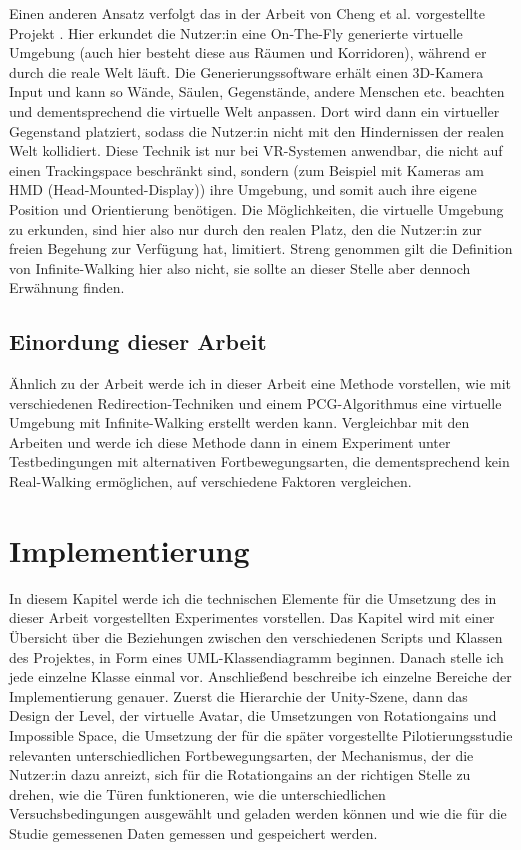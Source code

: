 Einen anderen Ansatz verfolgt das in der Arbeit \cite{microsoft} von Cheng et al. vorgestellte Projekt .
Hier erkundet die Nutzer:in eine On-The-Fly generierte virtuelle Umgebung (auch hier besteht diese aus Räumen und Korridoren), während er durch die reale Welt läuft. Die Generierungssoftware erhält einen 3D-Kamera Input und kann so Wände, Säulen, Gegenstände, andere Menschen etc. beachten und dementsprechend die virtuelle Welt anpassen. Dort wird dann ein virtueller Gegenstand platziert, sodass die Nutzer:in nicht mit den Hindernissen der realen Welt kollidiert.
Diese Technik ist nur bei VR-Systemen anwendbar, die nicht auf einen Trackingspace beschränkt sind, sondern (zum Beispiel mit Kameras am HMD (Head-Mounted-Display)) ihre Umgebung, und somit auch ihre eigene Position und Orientierung benötigen. Die Möglichkeiten, die virtuelle Umgebung zu erkunden, sind hier also nur durch den realen Platz, den die Nutzer:in zur freien Begehung zur Verfügung hat, limitiert. Streng genommen gilt die Definition von Infinite-Walking hier also nicht, sie sollte an dieser Stelle aber dennoch Erwähnung finden.

\section{Einordung dieser Arbeit}
Ähnlich zu der Arbeit \cite{flexible-spaces} werde ich in dieser Arbeit eine Methode vorstellen, wie mit verschiedenen Redirection-Techniken und einem PCG-Algorithmus eine virtuelle Umgebung mit Infinite-Walking erstellt werden kann.
Vergleichbar mit den Arbeiten \cite{peck-vergleich-2011} und \cite{langbehn-vergleich-2018} werde ich diese Methode dann in einem Experiment unter Testbedingungen mit alternativen Fortbewegungsarten, die dementsprechend kein Real-Walking ermöglichen, auf verschiedene Faktoren vergleichen.

\chapter{Implementierung}\label{chapter:implementation}

In diesem Kapitel werde ich die technischen Elemente für die Umsetzung des in dieser Arbeit vorgestellten Experimentes vorstellen.
Das Kapitel wird mit einer Übersicht über die Beziehungen zwischen den verschiedenen Scripts und Klassen des Projektes, in Form eines UML-Klassendiagramm beginnen.
Danach stelle ich jede einzelne Klasse einmal vor.
Anschließend beschreibe ich einzelne Bereiche der Implementierung genauer.
Zuerst die Hierarchie der Unity-Szene, dann das Design der Level, der virtuelle Avatar, die Umsetzungen von Rotationgains und Impossible Space, die Umsetzung der für die später vorgestellte Pilotierungsstudie relevanten unterschiedlichen Fortbewegungsarten, der Mechanismus, der die Nutzer:in dazu anreizt, sich für die Rotationgains an der richtigen Stelle zu drehen, wie die Türen funktioneren, wie die unterschiedlichen Versuchsbedingungen ausgewählt und geladen werden können und wie die für die Studie gemessenen Daten gemessen und gespeichert werden.

